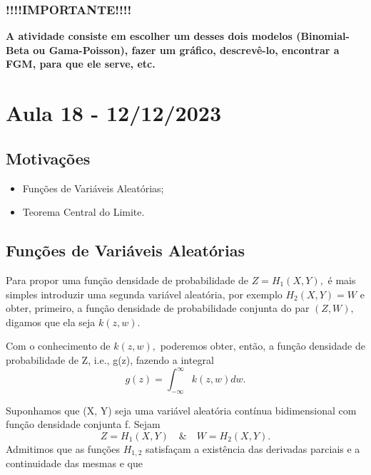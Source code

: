 \documentclass{article}
\begin{document}
\subsubsection{!!!!IMPORTANTE!!!!}
\textbf{A atividade consiste em escolher um desses dois modelos (Binomial-Beta ou Gama-Poisson), fazer um gráfico, descrevê-lo, encontrar a FGM, para que ele serve, etc.}
\newpage

\section{Aula 18 - 12/12/2023}
\subsection{Motivações} 
\begin{itemize}
  \item Funções de Variáveis Aleatórias;
  \item Teorema Central do Limite.
\end{itemize}
\subsection{Funções de Variáveis Aleatórias}
Para propor uma função densidade de probabilidade de \(Z = H_{1}(X, Y),\) é mais
simples introduzir uma segunda variável aleatória, por exemplo \(H_{2}(X, Y) = W\) e obter,
primeiro, a função densidade de probabilidade conjunta do par \((Z, W),\) digamos que ela seja \(k(z, w).\)

Com o conhecimento de \(k(z, w),\) poderemos obter, então, a função densidade de probabilidade de Z, i.e.,
g(z), fazendo a integral 
\[
  g(z) = \int_{-\infty}^{\infty}k(z, w)dw.
\]

Suponhamos que (X, Y) seja uma variável aleatória contínua bidimensional com função densidade conjunta f. Sejam 
\[
  Z = H_{1}(X, Y)\quad\&\quad W = H_{2}(X, Y).
\]
Admitimos que as funções \(H_{1, 2}\) satisfaçam a existência das derivadas parciais e a continuidade das mesmas e que
\end{document}
